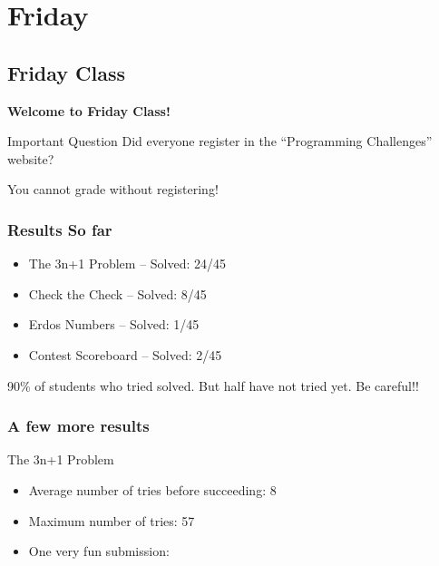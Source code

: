 \documentclass{beamer}
\begin{document}
\section{Friday}
\subsection{Friday Class}
\begin{frame}
  \begin{center}
  {\bf Welcome to Friday Class!}
  \end{center}
\end{frame}

\begin{frame}
  \begin{alertblock}{Important Question}
    Did everyone register in the ``Programming Challenges'' website?
  \end{alertblock}
  
  \bigskip

 You cannot grade without registering!
\end{frame}

\begin{frame}
  \frametitle{Results So far}
  \begin{itemize}
  \item The 3n+1 Problem -- Solved: 24/45
  \item Check the Check -- Solved: 8/45
  \item Erdos Numbers -- Solved: 1/45
  \item Contest Scoreboard -- Solved: 2/45
  \end{itemize}

  \bigskip

  90\% of students who tried solved. But half have not tried yet. Be careful!!

\end{frame}

\begin{frame}
  \frametitle{A few more results}
  \begin{block}{The 3n+1 Problem}
    \begin{itemize}
    \item Average number of tries before succeeding: 8
      \vspace{.5cm}
    \item Maximum number of tries: 57 
      \\
      \vspace{.5cm}
    \item One very fun submission:
    \end{itemize}
  \end{block}
\end{frame}
\end{document}
